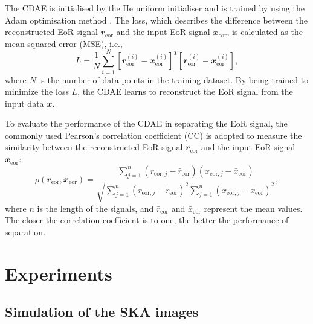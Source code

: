 \documentclass[fleqn,usenatbib]{mnras}
\newcommand{\R}[1]{\mathrm{#1}}
\newcommand{\B}[1]{\mathbfit{#1}}
\newcommand{\editwip}[1]{{\leavevmode\color{magenta}#1}}
\begin{document}
The CDAE is initialised by the He uniform initialiser \citep{he2015}
and is trained by using the Adam optimisation method \citep{kingma2015}.
The loss, which describes the difference between the reconstructed EoR
signal $\B{r}_{\R{eor}}$ and the input EoR signal $\B{x}_{\R{eor}}$,
is calculated as the mean squared error (MSE), i.e.,
\begin{equation}
  \label{eq:loss}
  L = \frac{1}{N} \sum_{i=1}^{N}
    \left[ \B{r}_{\R{eor}}^{(i)} - \B{x}_{\R{eor}}^{(i)} \right]^T
    \left[ \B{r}_{\R{eor}}^{(i)} - \B{x}_{\R{eor}}^{(i)} \right],
\end{equation}
where $N$ is the number of data points in the training dataset.
By being trained to minimize the loss $L$, the CDAE learns to
reconstruct the EoR signal from the input data $\B{x}$.

To evaluate the performance of the CDAE in separating the EoR signal,
the commonly used Pearson's correlation coefficient \editwip{(CC)}
\citep[e.g.,][]{harker2009,chapman2013}
is adopted to measure the similarity between the reconstructed EoR
signal $\B{r}_{\R{eor}}$ and the input EoR signal $\B{x}_{\R{eor}}$:
\begin{equation}
  \label{eq:corrcoef}
  \rho(\B{r}_{\R{eor}}, \B{x}_{\R{eor}})
      = \frac{\sum_{j=1}^{n}(r_{\R{eor},j} - \bar{r}_{\R{eor}})
      (x_{\R{eor},j} - \bar{x}_{\R{eor}})}{
        \sqrt{\sum_{j=1}^{n}(r_{\R{eor},j} - \bar{r}_{\R{eor}})^2
          \sum_{j=1}^{n}(x_{\R{eor},j} - \bar{x}_{\R{eor}})^2}
    },
\end{equation}
where $n$ is the length of the signals,
and $\bar{r}_{\R{eor}}$ and $\bar{x}_{\R{eor}}$ represent the mean values.
The closer the correlation coefficient is to one, the better the
performance of separation.


\section{Experiments}
\label{sec:experiments}

\subsection{Simulation of the SKA images}
\label{sec:simulation}
\end{document}
